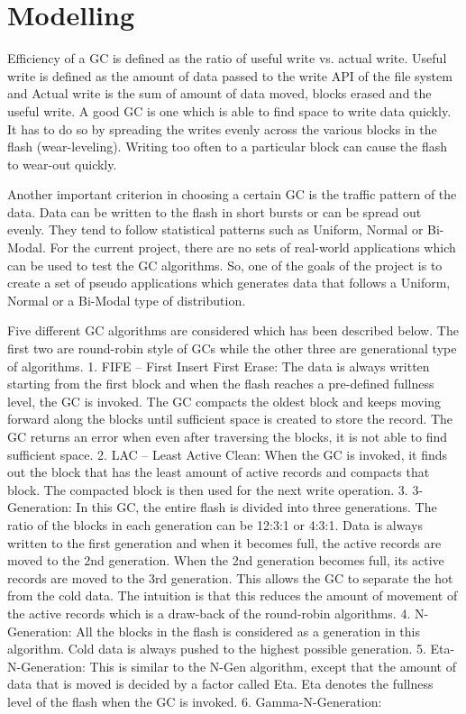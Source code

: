 \section{Modelling}
	Efficiency of a GC is defined as the ratio of useful write vs. actual write. Useful write is defined as the amount of data passed to the write API of the file system and Actual write is the sum of amount of data moved, blocks erased and the useful write. A good GC is one which is able to find space to write data quickly. It has to do so by spreading the writes evenly across the various blocks in the flash (wear-leveling). Writing too often to a particular block can cause the flash to wear-out quickly. 

	Another important criterion in choosing a certain GC is the traffic pattern of the data. Data can be written to the flash in short bursts or can be spread out evenly. They tend to follow statistical patterns such as Uniform, Normal or Bi-Modal. For the current project, there are no sets of real-world applications which can be used to test the GC algorithms. So, one of the goals of the project is to create a set of pseudo applications which generates data that follows a Uniform, Normal or a Bi-Modal type of distribution.

Five different GC algorithms are considered which has been described below. The first two are round-robin style of GCs while the other three are generational type of algorithms.
1.	FIFE – First Insert First Erase:
The data is always written starting from the first block and when the flash reaches a pre-defined fullness level, the GC is invoked. The GC compacts the oldest block and keeps moving forward along the blocks until sufficient space is created to store the record. The GC returns an error when even after traversing the blocks, it is not able to find sufficient space. 
2.	LAC – Least Active Clean:
When the GC is invoked, it finds out the block that has the least amount of active records and compacts that block. The compacted block is then used for the next write operation.
3.	3-Generation:
In this GC, the entire flash is divided into three generations. The ratio of the blocks in each generation can be 12:3:1 or 4:3:1. Data is always written to the first generation and when it becomes full, the active records are moved to the 2nd generation. When the 2nd generation becomes full, its active records are moved to the 3rd generation. This allows the GC to separate the hot from the cold data. The intuition is that this reduces the amount of movement of the active records which is a draw-back of the round-robin algorithms.
4.	N-Generation:
All the blocks in the flash is considered as a generation in this algorithm. Cold data is always pushed to the highest possible generation.
5.	Eta-N-Generation:
This is similar to the N-Gen algorithm, except that the amount of data that is moved is decided by a factor called Eta. Eta denotes the fullness level of the flash when the GC is invoked.
6.	Gamma-N-Generation:
	
